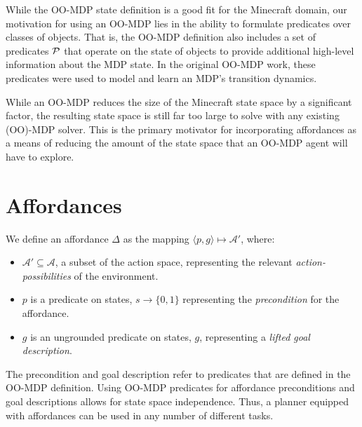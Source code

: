 \documentclass[conference]{IEEEtran}
\begin{document}
While the OO-MDP state definition is a good fit for the Minecraft
domain, our motivation for using an OO-MDP lies in the ability to
formulate predicates over classes of objects. That is, the OO-MDP
definition also includes a set of predicates ${\cal P}$ that operate
on the state of objects to provide additional high-level information
about the MDP state. 
In the original OO-MDP work,
these predicates were used to model and learn an MDP's transition
dynamics.

While an OO-MDP reduces the size of the Minecraft state space
by a significant factor, the resulting state space is still far too large to
solve with any existing (OO)-MDP solver. This is the primary motivator
for incorporating affordances as a means of reducing the amount of the
state space that an OO-MDP agent will have to explore.

\section{Affordances}
\label{sec:affordances}

We define an affordance $\Delta$ 
as the mapping $\langle p,g\rangle \longmapsto \mathcal{A}'$,
where:
\begin{itemize}
\item[] $\mathcal{A}' \subseteq \mathcal{A}$, a subset of the action space, representing the relevant {\it action-possibilities} of the environment.
\item[] $p$ is a predicate on states, $s \longrightarrow \{$0$, 1\}$
  representing the {\em precondition} for the affordance.
\item[] $g$ is an ungrounded predicate on states, $g$, representing a {\it lifted goal description}.
\end{itemize}
The precondition and goal description refer to predicates that are defined in the OO-MDP definition. 
Using OO-MDP predicates for affordance preconditions and goal descriptions 
allows for state space independence. Thus, a planner equipped with
affordances can be used in any number of different tasks. 
\end{document}
